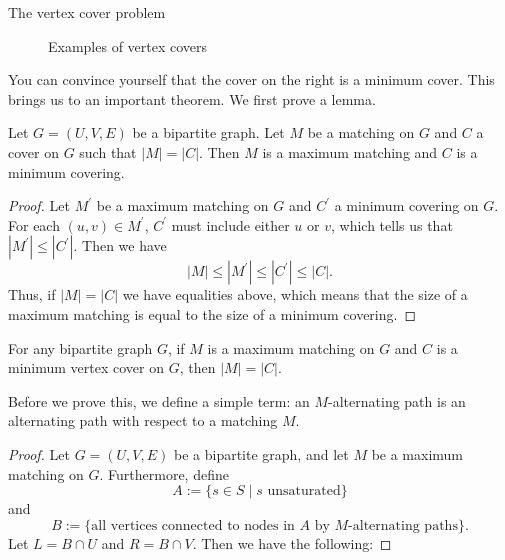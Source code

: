 \documentclass[11pt]{article}
\renewcommand{\'}{^{'}}
\newenvironment{theorem}[2][Theorem]{\begin{trivlist}
\item[\hskip \labelsep {\bfseries #1}\hskip \labelsep {\bfseries #2.}]}{\end{trivlist}}
\newenvironment{lemma}[2][Lemma]{\begin{trivlist}
\item[\hskip \labelsep {\bfseries #1}\hskip \labelsep {\bfseries #2.}]}{\end{trivlist}}
\begin{document}
\begin{section}{The vertex cover problem}
\begin{figure}[h]
		\caption{Examples of vertex covers}
	\end{figure}
	You can convince yourself that the cover on the right is a minimum cover. This brings us 
	to an important theorem. We first prove a lemma.

	\begin{lemma}{1}
		Let $G=(U,V,E)$ be a bipartite graph. Let $M$ be a matching on $G$ and $C$ a cover on 
		$G$ such that $|M| = |C|$. Then $M$ is a maximum matching and $C$ is a minimum 
		covering.
	\end{lemma}

	\begin{proof}
		Let $M\'$ be a maximum matching on $G$ and $C\'$ a minimum covering on $G$. For each 
		$(u,v)\in M\'$, $C\'$ must include either $u$ or $v$, which tells us that 
		$|M\'| \leq |C\'|$. Then we have 
		\[
			|M|\leq |M\'| \leq |C\'| \leq |C|.
		\]
		Thus, if $|M| = |C|$ we have equalities above, which means that the size of a maximum 
		matching is equal to the size of a minimum covering.
	\end{proof}

	\begin{theorem}{(K\H{o}nig-Egervary)}
		For any bipartite graph $G$, if $M$ is a maximum matching on $G$ and $C$ is a minimum 
		vertex cover  on $G$, then $|M| = |C|$.
	\end{theorem}
	Before we prove this, we define a simple term: an $M$-alternating path is an alternating path 
	with respect to a matching $M$.

	\begin{proof}
		Let $G=(U,V,E)$ be a bipartite graph, and let $M$ be a maximum matching on $G$. 
		Furthermore, define
		\[
			A := \{s\in S\; |\; s \text{ unsaturated}\}
		\]
		and
		\[
			B := \{\text{all vertices connected to nodes in $A$ by $M$-alternating paths}\}
			.
		\]
		Let $L = B\cap U$ and $R = B\cap V$. Then we have the following:


\end{proof}
\end{section}
\end{document}

